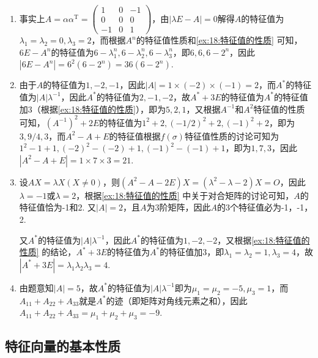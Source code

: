\begin{solution}
    \begin{enumerate}
        \item 事实上$A=\alpha\alpha^\mathrm{T}=\begin{pmatrix}
                      1 & 0 & -1 \\ 0 & 0 & 0 \\ -1 & 0 & 1
                  \end{pmatrix}$，由$|\lambda E-A|=0$解得$A$的特征值为$\lambda_1=\lambda_2=0,\lambda_3=2$，而根据$A^n$的特征值性质和\autoref{ex:18:特征值的性质} 可知，$6E-A^n$的特征值为$6-\lambda_1^n,6-\lambda_2^n,6-\lambda_3^n$，即$6,6,6-2^n$，因此$|6E-A^n|=6^2(6-2^n)=36(6-2^n)$.

        \item 由于$A$的特征值为$1,-2,-1$，因此$|A|=1\times(-2)\times(-1)=2$，而$A^*$的特征值为$|A|\lambda^{-1}$，因此$A^*$的特征值为$2,-1,-2$，故$A^*+3E$的特征值为$A^*$的特征值加3（根据\autoref{ex:18:特征值的性质}），即为$5,2,1$，又根据$A^{-1}$和$A^2$特征值的性质可知，$(A^{-1})^2+2E$的特征值为$1^2+2,(-1/2)^2+2,(-1)^2+2$，即为$3,9/4,3$，而$A^2-A+E$的特征值根据$f(\sigma)$特征值性质的讨论可知为$1^2-1+1,(-2)^2-(-2)+1,(-1)^2-(-1)+1$，即为$1,7,3$，因此$|A^2-A+E|=1\times 7\times 3=21$.

        \item 设$AX=\lambda X(X\neq 0)$，则$(A^2-A-2E)X=(\lambda^2-\lambda-2)X=O$，因此$\lambda=-1$或$\lambda=2$，根据\autoref{ex:18:特征值的性质} 中关于对合矩阵的讨论可知，$A$的特征值恰为-1和2. 又$|A|=2$，且$A$为3阶矩阵，因此$A$的3个特征值必为-1，-1，2.

              又$A^*$的特征值为$|A|\lambda^{-1}$，因此$A^*$的特征值为$1,-2,-2$，又根据\autoref{ex:18:特征值的性质} 的结论，$A^*+3E$的特征值为$A^*$的特征值加3，即$\lambda_1=\lambda_2=1,\lambda_3=4$，故$|A^*+3E|=\lambda_1\lambda_2\lambda_3=4$.

        \item 由题意知$|A|=5$，故$A^*$的特征值为$|A|\lambda^{-1}$即为$\mu_1=\mu_2=-5,\mu_3=1$，而$A_{11}+A_{22}+A_{33}$就是$A^*$的迹（即矩阵对角线元素之和），因此$A_{11}+A_{22}+A_{33}=\mu_1+\mu_2+\mu_3=-9$.
    \end{enumerate}
\end{solution}

\subsection{特征向量的基本性质}

